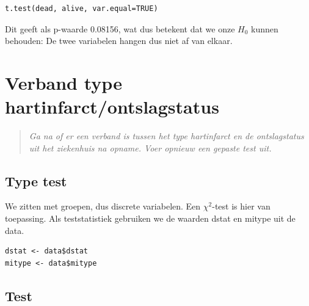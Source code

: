 \documentclass{article}
\begin{document}
\begin{verbatim}
t.test(dead, alive, var.equal=TRUE)
\end{verbatim}

Dit geeft als p-waarde 0.08156, wat dus betekent dat we onze $H_0$ kunnen behouden: De twee variabelen hangen dus niet af van elkaar. 

\section{Verband type hartinfarct/ontslagstatus}
\begin{quote}
\textit{
Ga na of er een verband is tussen het type hartinfarct en de ontslagstatus uit het ziekenhuis
na opname. Voer opnieuw een gepaste test uit.}
\end{quote}

\subsection{Type test}
We zitten met groepen, dus discrete variabelen. Een $\chi^2$-test is hier van toepassing. Als teststatistiek gebruiken we de waarden dstat en mitype uit de data. 

\begin{verbatim}
dstat <- data$dstat
mitype <- data$mitype
\end{verbatim}

\subsection{Test}
\end{document}
